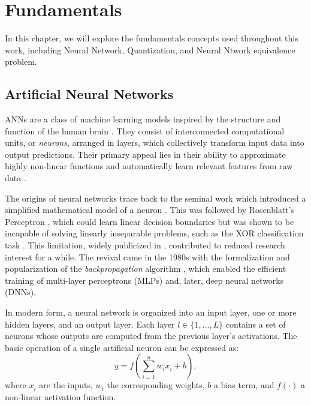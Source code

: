 \chapter{Fundamentals} \label{chap:fundamentos}

In this chapter, we will explore the fundamentals concepts used throughout this work, including Neural Network, Quantization, and Neural Ntwork equivalence problem.


\section{Artificial Neural Networks}\label{sec:ann}

ANNs are a class of machine learning models inspired by the structure and function of the human brain \cite{mcculloch1943logical}. They consist of interconnected computational units, or \textit{neurons}, arranged in layers, which collectively transform input data into output predictions. Their primary appeal lies in their ability to approximate highly non-linear functions and automatically learn relevant features from raw data \cite{goodfellow2016deep}.

The origins of neural networks trace back to the seminal work which introduced a simplified mathematical model of a neuron \cite{mcculloch1943logical}. This was followed by Rosenblatt's Perceptron \cite{Rosenblatt1958}, which could learn linear decision boundaries but was shown to be incapable of solving linearly inseparable problems, such as the XOR classification task \cite{minsky1969perceptrons}. This limitation, widely publicized in \cite{minsky1969perceptrons}, contributed to reduced research interest for a while. The revival came in the 1980s with the formalization and popularization of the \textit{backpropagation} algorithm \cite{werbos1974beyond,rumelhart1986learning}, which enabled the efficient training of multi-layer perceptrons (MLPs) and, later, deep neural networks (DNNs).

In modern form, a neural network is organized into an input layer, one or more hidden layers, and an output layer. Each layer $l \in \{1, \dots, L\}$ contains a set of neurons whose outputs are computed from the previous layer's activations. The basic operation of a single artificial neuron can be expressed as:
\begin{equation}
    y = f\left( \sum_{i=1}^{n} w_i x_i + b \right),
    \end{equation}
where $x_i$ are the inputs, $w_i$ the corresponding weights, $b$ a bias term, and $f(\cdot)$ a non-linear activation function. 

